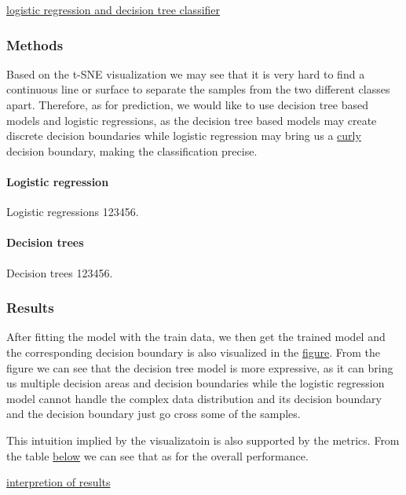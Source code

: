 \documentclass{article}
\begin{document}
\underline{logistic regression and decision tree classifier}

\subsubsection*{Methods}

Based on the t-SNE visualization we may see that it is very hard to find a continuous line or surface to separate the samples from the two different classes apart. 
Therefore, as for prediction, we would like to use decision tree based models and logistic regressions, as the decision tree based models may create discrete decision boundaries while logistic regression may bring us a \underline{curly} decision boundary, making the classification precise.

\paragraph{Logistic regression} Logistic regressions 123456.

\paragraph{Decision trees} Decision trees 123456.

\subsubsection*{Results}




After fitting the model with the train data, we then get the trained model and the corresponding decision boundary is also visualized in the \underline{figure}. From the figure we can see that the decision tree model is more expressive, as it can bring us multiple decision areas and decision boundaries while the logistic regression model cannot handle the complex data distribution and its decision boundary and the decision boundary just go cross some of the samples. 


This intuition implied by the visualizatoin is also supported by the metrics. From the table \underline{below} we can see that as for the overall performance. 

\underline{interpretion of results}
\end{document}
